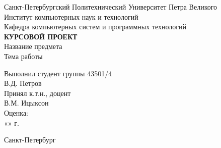 
	\begin{center}		%

		Санкт-Петербургский Политехнический Университет Петра Великого\\
		Институт компьютерных наук и технологий \\
		Кафедра компьютерных систем и программных технологий\\[3cm]
		
		\huge \textbf{КУРСОВОЙ ПРОЕКТ}\\[0.5cm]
		\large Название предмета\\[0.1cm]
		\large Тема работы\\[2cm]

	\end{center}


	\begin{flushright} %

				\large Выполнил студент группы 43501/4\\
				\large В.Д. Петров\\[0.5cm]
				
				\large Принял к.т.н., доцент\\
				\sign[4cm]\large  В.М. Ицыксон\\
				\large Оценка: \sign\\
				«\underline{\hspace{0.7cm}}» \underline{\hspace{2cm}} \the\year г.

	\end{flushright}
	
	\vfill %

	\begin{center}
	\large Санкт-Петербург\\
	\large \the\year %
	\end{center} %

\thispagestyle{empty} %
\newpage
